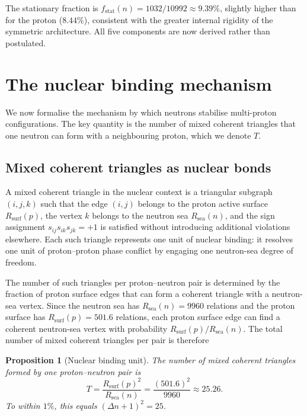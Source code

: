 \documentclass[11pt,a4paper]{article}
\newtheorem{proposition}[theorem]{Proposition}
\theoremstyle{definition}
\newcommand{\Rsurf}{R_{\mathrm{surf}}}
\newcommand{\Rsea}{R_{\mathrm{sea}}}
\newcommand{\fstat}{f_{\mathrm{stat}}}
\begin{document}
\medskip\noindent The stationary fraction is $\fstat(n) = 1032/10992 \approx 9.39\%$, slightly higher than for the proton ($8.44\%$), consistent with the greater internal rigidity of the symmetric architecture. All five components are now derived rather than postulated.

\section{The nuclear binding mechanism}
\label{sec:binding}

We now formalise the mechanism by which neutrons stabilise multi-proton configurations. The key quantity is the number of mixed coherent triangles that one neutron can form with a neighbouring proton, which we denote $T$.

\subsection{Mixed coherent triangles as nuclear bonds}
\label{subsec:triangles}

A mixed coherent triangle in the nuclear context is a triangular subgraph $(i,j,k)$ such that the edge $(i,j)$ belongs to the proton active surface $\Rsurf(p)$, the vertex $k$ belongs to the neutron sea $\Rsea(n)$, and the sign assignment $s_{ij}s_{ik}s_{jk} = +1$ is satisfied without introducing additional violations elsewhere.\cite{Exponent_18_PDL_2026,Effective_Fields_PDL_2026} Each such triangle represents one unit of nuclear binding: it resolves one unit of proton--proton phase conflict by engaging one neutron-sea degree of freedom.

The number of such triangles per proton--neutron pair is determined by the fraction of proton surface edges that can form a coherent triangle with a neutron-sea vertex. Since the neutron sea has $\Rsea(n) = 9960$ relations and the proton surface has $\Rsurf(p) = 501.6$ relations, each proton surface edge can find a coherent neutron-sea vertex with probability $\Rsurf(p)/\Rsea(n)$. The total number of mixed coherent triangles per pair is therefore

\begin{proposition}[Nuclear binding unit]
\label{prop:T}
The number of mixed coherent triangles formed by one proton--neutron pair is
\[
T = \frac{\Rsurf(p)^2}{\Rsea(n)} = \frac{(501.6)^2}{9960} \approx 25.26.
\]
To within $1\%$, this equals $(\Delta n + 1)^2 = 25$.
\end{proposition}
\end{document}
